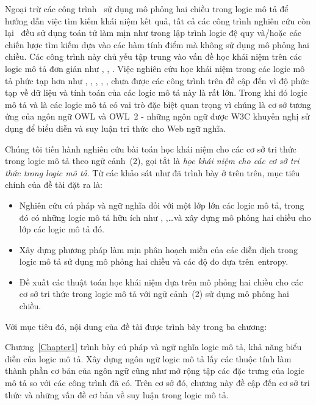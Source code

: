 Ngoại trừ các công trình~\cite{Nguyen2013,Tran2012,Ha2012} sử dụng mô phỏng hai chiều trong logic mô tả để hướng dẫn việc tìm kiếm khái niệm kết quả, tất cả các công trình nghiên cứu còn lại~\cite{Quinlan1990,Cohen1994,Lambrix1998,Badea2000,Iannone2007,Fanizzi2004,Fanizzi2008,Lehmann2007,Fanizzi2010,Lehmann2010,Nguyen2013} đều sử dụng toán tử làm mịn như trong lập trình logic đệ quy và/hoặc các chiến lược tìm kiếm dựa vào các hàm tính điểm mà không sử dụng mô phỏng hai chiều.
Các công trình này chủ yếu tập trung vào vấn đề học khái niệm trên các logic mô tả đơn giản như \ALER, \ALN, \ALC. 
%
Việc nghiên cứu học khái niệm trong các logic mô tả phức tạp hơn như \ALCN, \ALCQ, \ALCIQ, \SHIQ, \SHOIQ, \SROIQ chưa được các công trình trên đề cập đến vì độ phức tạp về dữ liệu và tính toán của các logic mô tả này là rất lớn. Trong khi đó logic mô tả \SHOIQ và \SROIQ là các logic mô tả có vai trò đặc biệt quan trọng vì chúng là cơ sở tương ứng của ngôn ngữ OWL và OWL~2 - những ngôn ngữ được W3C khuyến nghị sử dụng để biểu diễn và suy luận tri thức cho Web ngữ nghĩa.

Chúng tôi tiến hành nghiên cứu bài toán học khái niệm cho các cơ sở tri thức trong logic mô tả theo ngữ cảnh~(2), gọi tắt là {\em học khái niệm cho các cơ sở tri thức trong logic mô tả}. Từ các khảo sát như đã trình bày ở trên trên, mục tiêu chính của đề tài đặt ra là:
\begin{itemize}
	\item Nghiên cứu cú pháp và ngữ nghĩa đối với một lớp lớn các logic mô tả, trong đó có những logic mô tả hữu ích như \SHOIQ, \SROIQ,\ldots và xây dựng mô phỏng hai chiều cho lớp các logic mô tả đó.

	\item Xây dựng phương pháp làm mịn phân hoạch miền của các diễn dịch trong logic mô tả sử dụng mô phỏng hai chiều và các độ đo dựa trên~entropy.
	
	\item Đề xuất các thuật toán học khái niệm dựa trên mô phỏng hai chiều cho các cơ sở tri thức trong logic mô tả với ngữ cảnh~(2) sử dụng mô phỏng hai chiều.
\end{itemize}
Với mục tiêu đó, nội dung của đề tài được trình bày trong ba chương:

Chương~\ref{Chapter1} trình bày cú pháp và ngữ nghĩa logic mô tả, khả năng biểu diễn của logic mô tả. Xây dựng ngôn ngữ logic mô tả lấy các thuộc tính làm thành phần cơ bản của ngôn ngữ cũng như mở rộng tập các đặc trưng của logic mô tả so với các công trình đã có. Trên cơ sở đó, chương này đề cập đến cơ sở tri thức và những vấn đề cơ bản về suy luận trong logic mô tả.
	
